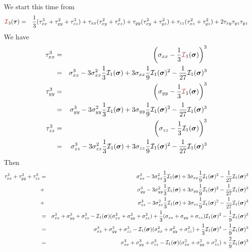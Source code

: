 We start this time from
\begin{eqnarray}
{\III}_3(\bm\tau) 
&=& 
\frac{1}{3}(\tau_{xx}^3 + \tau_{yy}^2 + \tau_{zz}^3) 
+\tau_{xx}(\tau_{xy}^2 + \tau_{xz}^2 ) 
+\tau_{yy}(\tau_{xy}^2 + \tau_{yz}^2 ) 
+\tau_{zz}(\tau_{xz}^2 + \tau_{yz}^2 ) 
+2\tau_{xy}\tau_{yz}\tau_{yz} \nn
\end{eqnarray}
We have
\begin{eqnarray}
\tau_{xx}^3 
&=& \left(\sigma_{xx}-\frac13 {\III}_1(\bm\sigma) \right)^3 \nn\\
&=& \sigma_{xx}^3 - 3\sigma_{xx}^2 \frac13 {\cal I}_1(\bm\sigma) 
+ 3 \sigma_{xx} \frac19  {\cal I}_1(\bm\sigma)^2 - \frac{1}{27} {\cal I}_1(\bm\sigma)^3  \nn\\
\tau_{yy}^3 
&=& \left(\sigma_{yy}-\frac13 {\III}_1(\bm\sigma) \right)^3 \nn\\
&=& \sigma_{yy}^3 - 3\sigma_{yy}^2 \frac13 {\cal I}_1(\bm\sigma) 
+ 3 \sigma_{yy} \frac19  {\cal I}_1(\bm\sigma)^2 - \frac{1}{27} {\cal I}_1(\bm\sigma)^3  \nn\\
\tau_{zz}^3 
&=& \left(\sigma_{zz}-\frac13 {\cal I}_1(\bm\sigma) \right)^3 \nn\\
&=& \sigma_{zz}^3 - 3\sigma_{zz}^2 \frac13 {\cal I}_1(\bm\sigma) 
+ 3 \sigma_{zz} \frac19  {\cal I}_1(\bm\sigma)^2 - \frac{1}{27} {\cal I}_1(\bm\sigma)^3  \nn
\end{eqnarray}
Then 
\begin{eqnarray}
\tau_{xx}^3 + \tau_{yy}^2 + \tau_{zz}^3 
&=&
\sigma_{xx}^3 - 3\sigma_{xx}^2 \frac13 {\cal I}_1(\bm\sigma) 
+ 3 \sigma_{xx} \frac19  {\cal I}_1(\bm\sigma)^2 - \frac{1}{27} {\cal I}_1(\bm\sigma)^3  \nonumber\\
&+& \sigma_{yy}^3 - 3\sigma_{yy}^2 \frac13 {\cal I}_1(\bm\sigma) 
+ 3 \sigma_{yy} \frac19  {\cal I}_1(\bm\sigma)^2 - \frac{1}{27} {\cal I}_1(\bm\sigma)^3  \nonumber\\
&+& \sigma_{zz}^3 - 3\sigma_{zz}^2 \frac13 {\cal I}_1(\bm\sigma) 
+ 3 \sigma_{zz} \frac19  {\cal I}_1(\bm\sigma)^2 - \frac{1}{27} {\cal I}_1(\bm\sigma)^3 \nonumber\\
&=&
\sigma_{xx}^3 + \sigma_{yy}^3 + \sigma_{zz}^3
-{\cal I}_1(\bm\sigma) (\sigma_{xx}^2+\sigma_{yy}^2+\sigma_{zz}^2)
+\frac13 (\sigma_{xx} + \sigma_{yy} + \sigma_{zz}) {\cal I}_1(\bm\sigma)^2
-\frac19 {\cal I}_1(\bm\sigma)^3 \nonumber\\
&=&
\sigma_{xx}^3 + \sigma_{yy}^3 + \sigma_{zz}^3
-{\cal I}_1(\bm\sigma) (\sigma_{xx}^2+\sigma_{yy}^2+\sigma_{zz}^2)
+\frac13 {\cal I}_1(\bm\sigma)^3
-\frac19 {\cal I}_1(\bm\sigma)^3 \nonumber\\
&=&
\sigma_{xx}^3 + \sigma_{yy}^3 + \sigma_{zz}^3
-{\cal I}_1(\bm\sigma) (\sigma_{xx}^2+\sigma_{yy}^2+\sigma_{zz}^2)
+\frac29 {\cal I}_1(\bm\sigma)^3 \nonumber
\end{eqnarray}

